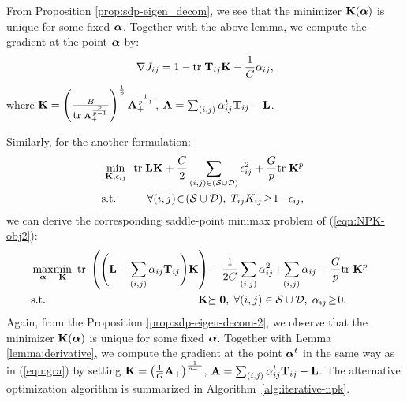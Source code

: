 From Proposition \ref{prop:sdp-eigen_decom}, we see that the minimizer ${\bf K}({\boldsymbol{\alpha}})$ is
unique for some fixed ${\boldsymbol{\alpha}}$. Together with the above lemma, we compute the
gradient at the point ${\boldsymbol{\alpha}}$ by:
\begin{equation}
\nabla\J_{ij} = 1-\tr\T_{ij}\K-\frac{1}{C}\a_{ij}, \label{eqn:gra}
\end{equation}
where ${\bf K} = \left(\frac{B}{{\mbox{tr}\;}
{\bf A}_+^{\frac{p}{p-1}}}\right)^{\frac{1}{p}}{\bf A}_+^{\frac{1}{p-1}}$,
${\bf A}=\sum_{(i,j) } {\alpha}_{ij}^t {\bf T}_{ij} - {\bf L}$.


Similarly, for the another formulation:
\begin{eqnarray}
\!& \!\min_{\K, \epsilon_{ij}}\!&\!\tr \L\K + \frac{C}{2}\sum_{(i,j)\in(\SS\cup\DD)}\epsilon_{ij}^2 +\frac{G}{p}\tr \K^p  \label{eqn:NPK-obj2}\\
\!\!&\!\!\mbox{s.t.}\!\!&\!\!\forall (i,j)\!\in \!(\SS\cup\DD),
                                 \; T_{ij}K_{ij}\! \geq\! 1 \!- \!\epsilon_{ij},                                \nonumber
\end{eqnarray}
we can derive the corresponding saddle-point minimax problem of
(\ref{eqn:NPK-obj2}):
\begin{eqnarray}
\!\!\!\!&\!\!\max_{\ba}\!\min_{\K}\!\!&\!\tr\left(\Bigg(\L-\sum_{(i,j)}
\a_{ij}\T_{ij}\Bigg)\K\right)
- \frac{1}{2C}\sum_{(i,j)}\a_{ij}^2\!+\!\sum_{(i,j)} \a_{ij} + \frac{G}{p}\tr \K^p\nonumber\\%
\!\!\!\!&\!\!\mbox{s.t.}\!&\!\K\psd,\;\forall
(i,j)\in\SS\cup\DD, \; \a_{ij}\!\geq\!
0.\;\;\;\;\;\;\;\nonumber
\end{eqnarray}
Again, from the Proposition \ref{prop:sdp-eigen-decom-2}, we observe that the
minimizer ${\bf K}({\boldsymbol{\alpha}})$ is unique for some fixed ${\boldsymbol{\alpha}}$. Together with Lemma
\ref{lemma:derivative}, we compute the gradient at the point ${\boldsymbol{\alpha}}^t$ in the same way
as in (\ref{eqn:gra}) by setting ${\bf K} =
\left(\frac{1}{G}{\bf A}_+\right)^{\frac{1}{p-1}}$, ${\bf A}=\sum_{(i,j) } {\alpha}_{ij}^t {\bf T}_{ij} -
{\bf L}$. The alternative optimization algorithm is summarized in
Algorithm~\ref{alg:iterative-npk}.


